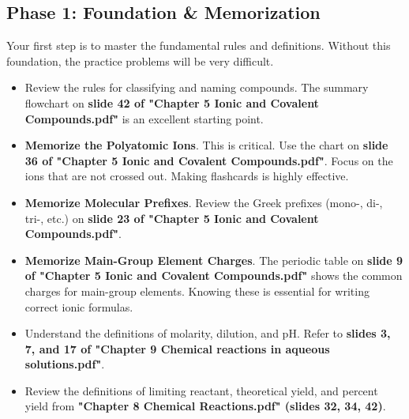 \documentclass{article}
\begin{document}
\subsection*{Phase 1: Foundation \& Memorization}
Your first step is to master the fundamental rules and definitions. Without this foundation, the practice problems will be very difficult.
\begin{itemize}[itemsep=5pt]
    \item Review the rules for classifying and naming compounds. The summary flowchart on \textbf{slide 42 of "Chapter 5 Ionic and Covalent Compounds.pdf"} is an excellent starting point.
    \item \textbf{Memorize the Polyatomic Ions}. This is critical. Use the chart on \textbf{slide 36 of "Chapter 5 Ionic and Covalent Compounds.pdf"}. Focus on the ions that are not crossed out. Making flashcards is highly effective.
    \item \textbf{Memorize Molecular Prefixes}. Review the Greek prefixes (mono-, di-, tri-, etc.) on \textbf{slide 23 of "Chapter 5 Ionic and Covalent Compounds.pdf"}.
    \item \textbf{Memorize Main-Group Element Charges}. The periodic table on \textbf{slide 9 of "Chapter 5 Ionic and Covalent Compounds.pdf"} shows the common charges for main-group elements. Knowing these is essential for writing correct ionic formulas.
    \item Understand the definitions of molarity, dilution, and pH. Refer to \textbf{slides 3, 7, and 17 of "Chapter 9 Chemical reactions in aqueous solutions.pdf"}.
    \item Review the definitions of limiting reactant, theoretical yield, and percent yield from \textbf{"Chapter 8 Chemical Reactions.pdf" (slides 32, 34, 42)}.
\end{itemize}

\bigskip
\end{document}
